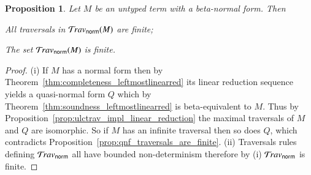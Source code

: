 \documentclass{elsarticle}
\theoremstyle{plain}
\newtheorem{proposition}[theorem]{Proposition}
\theoremstyle{definition}
\newcommand{\normalizing}{{\sf norm}}
\newcommand{\travsetnorm}{\travset_\normalizing} %
\begin{document}
\begin{proposition}
\label{prop:ulc_travnorm_finite}
Let $M$ be an untyped term with a beta-normal form. Then
\begin{enumerate*}[label=(\roman*)]
\item All traversals in $\travsetnorm(M)$ are finite;
\item The set $\travsetnorm(M)$ is finite.
\end{enumerate*}
\end{proposition}
\begin{proof}
(i) If $M$ has a normal form then by Theorem~\ref{thm:completeness_leftmostlinearred} its linear reduction sequence yields a quasi-normal form $Q$ which by Theorem~\ref{thm:soundness_leftmostlinearred} is beta-equivalent to $M$. Thus by Proposition~\ref{prop:ulctrav_impl_linear_reduction} the maximal traversals of $M$ and $Q$ are isomorphic. So if $M$ has an infinite traversal then so does $Q$, which contradicts Proposition~\ref{prop:qnf_traversals_are_finite}.
(ii) Traversals rules defining $\travsetnorm$ all have bounded non-determinism therefore by (i) $\travsetnorm$ is finite.
\end{proof}

\end{document}
